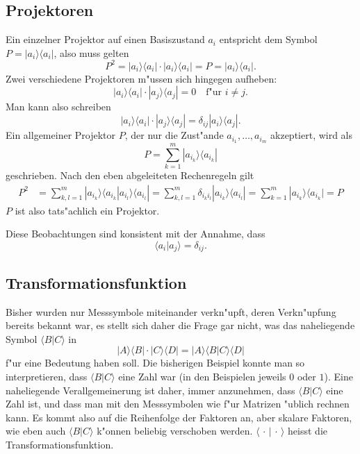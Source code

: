 \subsection{Projektoren}
Ein einzelner Projektor auf einen Basiszustand $a_i$ entspricht dem Symbol
$P= |a_i\rangle\langle a_i|$, also muss gelten
\[
P^2 = 
|a_i\rangle\langle a_i|
\cdot
|a_i\rangle\langle a_i|
=P
=
|a_i\rangle\langle a_i|.
\]
Zwei verschiedene Projektoren m"ussen sich hingegen aufheben:
\[
|a_i\rangle\langle a_i|
\cdot
|a_j\rangle\langle a_j|
=
0 \quad\text{f"ur $i\ne j$}.
\]
Man kann also schreiben
\[
|a_i\rangle\langle a_i|
\cdot
|a_j\rangle\langle a_j|
=\delta_{ij} |a_i\rangle\langle a_j|.
\]
Ein allgemeiner Projektor $P$, der nur die Zust"ande $a_{i_1},\dots ,a_{i_m}$
akzeptiert, wird als
\[
P = \sum_{k=1}^m |a_{i_k}\rangle \langle a_{i_k}|
\]
geschrieben.
Nach den eben abgeleiteten Rechenregeln gilt
\begin{align*}
P^2
&=
\sum_{k,l=1}^m |a_{i_k}\rangle\langle a_{i_k}|a_{i_l}\rangle\langle a_{i_l}|
=
\sum_{k,l=1}^m \delta_{i_ki_l}|a_{i_k}\rangle\langle a_{i_l}|
=
\sum_{k=1}^m |a_{i_k}\rangle\langle a_{i_k}| = P
\end{align*}
$P$ ist also tats"achlich ein Projektor.

Diese Beobachtungen sind konsistent mit der Annahme, dass
\[
\langle a_i|a_j\rangle = \delta_{ij}.
\]

\subsection{Transformationsfunktion}
Bisher wurden nur Messsymbole miteinander verkn"upft, deren 
Verkn"upfung bereits bekannt war, es stellt sich daher die
Frage gar nicht, was das naheliegende Symbol $\langle B|C\rangle$
in
\[
|A\rangle\langle B|\cdot |C\rangle\langle D|
=
|A\rangle \langle B|C\rangle \langle D|
\]
f"ur eine Bedeutung haben soll. Die bisherigen Beispiel konnte
man so interpretieren, dass $\langle B|C\rangle$ eine Zahl war
(in den Beispielen jeweils $0$ oder $1$).
Eine naheliegende Verallgemeinerung ist daher, immer anzunehmen,
dass $\langle B|C\rangle$ eine Zahl ist, und dass man mit den
Messsymbolen wie f"ur Matrizen "ublich rechnen kann.
Es kommt also auf die Reihenfolge der Faktoren an, aber skalare
Faktoren, wie eben auch $\langle B|C\rangle$ k"onnen beliebig
verschoben werden.
$\langle \,\cdot\, |\,\cdot\, \rangle$ heisst die Transformationsfunktion.


